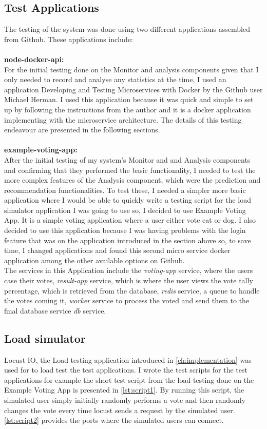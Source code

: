 \subsection{Test Applications}
The testing of the system was done using two different applications assembled from Github. These applications include:\\\\
\textbf{node-docker-api:}\\
For the initial testing done on the Monitor and analysis components given that I only needed to record and analyse any statistics at the time, I used an application Developing and Testing Microservices with Docker \cite{node-docker-api} by the Github user Michael Herman. I used this application because it was quick and simple to set up by following the instructions from the author and it is a docker application implementing with the microservice architecture. The details of this testing endeavour are presented in the following sections.\\\\
\textbf{example-voting-app:}\\
After the initial testing of my system's Monitor and and Analysis components and confirming that they performed the basic functionality, I needed to test the more complex features of the Analysis component, which were the prediction and recommendation functionalities. To test these, I needed a simpler more basic application where I would be able to quickly write a testing script for the load simulator application I was going to use so, I decided to use \cite{example-voting-app} Example Voting App. It is a simple voting application where a user either vote cat or dog. I also decided to use this application because I was having problems with the login feature that was on the application introduced in the section above so, to save time, I changed applications and found this second micro service docker application among the other available options on Github.\\
The services in this Application include the \textit{voting-app} service, where the users case their votes, \textit{result-app} service, which is where the user views the vote tally percentage, which is retrieved from the database, \textit{redis} service, a queue to handle the votes coming it, \textit{worker} service to process the voted and send them to the final database service \textit{db} service.
\subsection{Load simulator}
Locust IO\cite{locustIO}, the Load testing application introduced in \autoref{ch:implementation} was used for to load test the test applications. I wrote the test scripts for the test applications for example the short test script from the load testing done on the Example Voting App is presented in \autoref{lst:script1}. By running this script, the simulated user simply initially randomly performs a vote and then randomly changes the vote every time locust sends a request by the simulated user. \autoref{lst:script2} provides the ports where the simulated users can connect.

